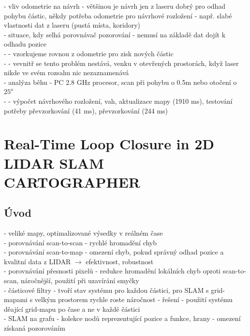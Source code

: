 \documentclass[11pt]{article}
\begin{document}
 - vliv odometrie na návrh - většinou je návrh jen z laseru dobrý pro odhad pohybu částic, někdy potřeba odometrie pro návrhové rozložení - např. slabé vlastnosti dat z laseru (pustá místa, koridory)\\
 - situace, kdy selhá porovnávač pozorování - nemusí na základě dat dojít k odhadu pozice\\
 - - vzorkujeme rovnou z odometrie pro zisk nových částic\\
 - - vevnitř se tento problém nestává, venku v otevřených prostorách, když laser nikde ve svém rozsahu nic nezaznamenává\\
 - analýza běhu - PC 2.8 GHz procesor, scan při pohybu o 0.5m nebo otočení o $25^o$\\
 - - výpočet návrhového rozložení, vah, aktualizace mapy (1910 ms), testování potřeby převzorkování (41 ms), převzorkování (244 ms)\\


\newpage

\section{Real-Time Loop Closure in 2D LIDAR SLAM \\ CARTOGRAPHER}

\subsection{Úvod}
- veliké mapy, optimalizované výsedky v reálném čase\\
- porovnávání scan-to-scan - rychlé hromadění chyb\\
- porovnávání scan-to-map -  omezení chyb, pokud správný odhad pozice a kvalitní data z LIDAR $\rightarrow$ efektivnost, robustnost\\
- porovnávání přesnosti pixelů - redukce hromadění lokálních chyb oproti scan-to-scan, náročnější, použití při uzavírání smyčky\\
- částicové filtry - tvoří stav systému pro každou částici, pro SLAM s grid-mapami s velkým prostorem rychle roste náročnost - řešení - použití systému děající grid-mapu po čase a ne v každé částici\\
- SLAM na grafu - kolekce nodů reprezentující pozice a funkce, hrany - omezení získaná pozorováním\\
\end{document}
